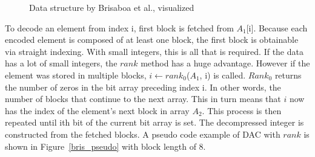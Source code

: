 \begin{figure}[ht]
\centering
{}
\caption{Data structure by Brisaboa et al., visualized}\label{bris_ds}

\end{figure}

To decode an element from index i, first block is fetched from $A_1$[i]. Because each encoded element is composed of at least one block, the first block is obtainable via straight indexing. With small integers, this 
is all that is required. If the data has a lot of small integers, the $rank$ method has a huge advantage. However if the element was stored in multiple blocks, $i \gets rank_0$($A_1$, i) is called. $Rank_0$ 
returns the number of zeros in the bit array preceding index i. In other words, the number of blocks that continue to the next array. This in turn means that $i$ now has the index of the element's next block in array $A_2$.
This process is then repeated until ith bit of the current bit array is set. The decompressed integer is constructed from the fetched blocks. A pseudo code example of DAC with $rank$ is shown in Figure~\ref{bris_pseudo} 
with block length of 8.


